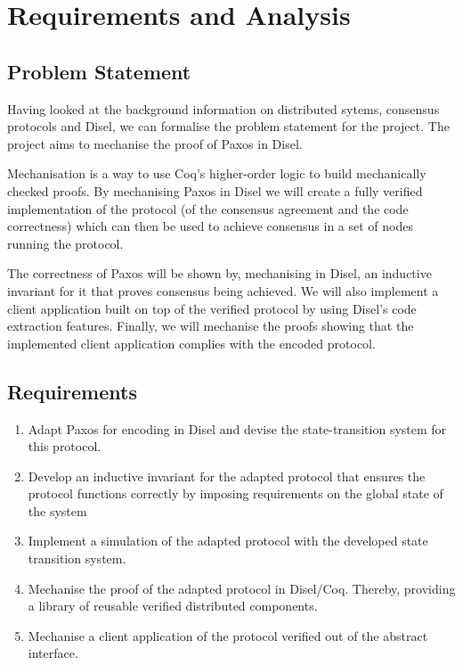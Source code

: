 \chapter{Requirements and Analysis}

\section{Problem Statement}
Having looked at the background information on distributed sytems, consensus
protocols and Disel, we can formalise the problem statement for the project.
The project aims to mechanise the proof of Paxos in Disel.

Mechanisation is a way to use Coq's higher-order logic to build mechanically
checked proofs. By mechanising
Paxos in Disel we will create a fully verified implementation of the protocol
(of the consensus agreement and the code correctness)
which can then be used to achieve consensus in a set of nodes running the protocol.


The correctness of Paxos will be shown by, mechanising in Disel, an inductive
invariant for it that proves consensus being achieved.
We will also implement a client application built on top
of the verified protocol by using Disel's code extraction features.
Finally, we will mechanise the proofs showing that the implemented
client application complies with the encoded protocol.



\section{Requirements}
\begin{enumerate}
  \item Adapt Paxos for encoding in Disel and devise the state-transition system for this protocol.
  \item Develop an inductive invariant for the adapted protocol that
    ensures the protocol functions correctly by imposing requirements on the global state of the system
  \item Implement a simulation of the adapted protocol with the developed state transition system.
  \item Mechanise the proof of the adapted protocol in Disel/Coq.
    Thereby, providing a library of reusable verified distributed components.
  \item Mechanise a client application of the protocol verified out of the abstract interface.
\end{enumerate}

